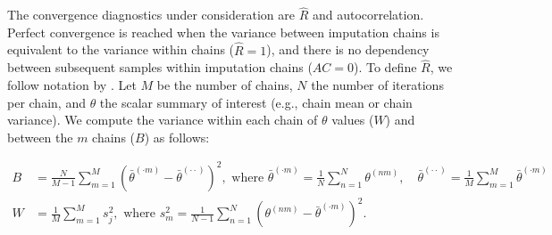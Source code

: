 \documentclass[article]{jss}
\begin{document}
The convergence diagnostics under consideration are $\widehat{R}$ and autocorrelation. Perfect convergence is reached when the variance between imputation chains is equivalent to the variance within chains ($\widehat{R} = 1$), and there is no dependency between subsequent samples within imputation chains ($AC = 0$). 
%
%
%
%
To define $\widehat{R}$, we follow notation by \citep[p.~5]{veht19}. %
Let $M$ be the number of chains, $N$ the number of iterations per chain, and $\theta$ the scalar summary of interest (e.g., chain mean or chain variance).
We compute the variance within each chain of $\theta$ values ($W$) and between the $m$ chains ($B$) as follows:

\begin{align*}
B&=\frac{N}{M-1} \sum_{m=1}^{M}\left(\bar{\theta}^{(\cdot m)}-\bar{\theta}^{(\cdot \cdot)}\right)^{2}, \text { where } \bar{\theta}^{(\cdot m)}=\frac{1}{N} \sum_{n=1}^{N} \theta^{(n m)}, \quad \bar{\theta}^{(\cdot \cdot)}=\frac{1}{M} \sum_{m=1}^{M} \bar{\theta}^{(\cdot m)} \\
W&=\frac{1}{M} \sum_{m=1}^{M} s_{j}^{2},  \text { where } s_{m}^{2}=\frac{1}{N-1} \sum_{n=1}^{N}\left(\theta^{(n m)}-\bar{\theta}^{(\cdot m)}\right)^{2}. %
\end{align*}
\end{document}
